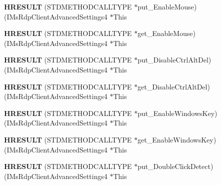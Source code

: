 \begin{DoxyCompactItemize}
{\bfseries H\+R\+E\+S\+U\+LT} (S\+T\+D\+M\+E\+T\+H\+O\+D\+C\+A\+L\+L\+T\+Y\+PE $\ast$put\+\_\+\+Enable\+Mouse)(I\+Ms\+Rdp\+Client\+Advanced\+Settings4 $\ast$This
\item 
\mbox{\label{struct_i_ms_rdp_client_advanced_settings4_vtbl_a400a5fcb065970bcc51a69e902e22c4b}} 
{\bfseries H\+R\+E\+S\+U\+LT} (S\+T\+D\+M\+E\+T\+H\+O\+D\+C\+A\+L\+L\+T\+Y\+PE $\ast$get\+\_\+\+Enable\+Mouse)(I\+Ms\+Rdp\+Client\+Advanced\+Settings4 $\ast$This
\item 
\mbox{\label{struct_i_ms_rdp_client_advanced_settings4_vtbl_a44094f00ae7624aa49920ff206dfb2fc}} 
{\bfseries H\+R\+E\+S\+U\+LT} (S\+T\+D\+M\+E\+T\+H\+O\+D\+C\+A\+L\+L\+T\+Y\+PE $\ast$put\+\_\+\+Disable\+Ctrl\+Alt\+Del)(I\+Ms\+Rdp\+Client\+Advanced\+Settings4 $\ast$This
\item 
\mbox{\label{struct_i_ms_rdp_client_advanced_settings4_vtbl_af8ef56e8b9ce6569364457fee005ec81}} 
{\bfseries H\+R\+E\+S\+U\+LT} (S\+T\+D\+M\+E\+T\+H\+O\+D\+C\+A\+L\+L\+T\+Y\+PE $\ast$get\+\_\+\+Disable\+Ctrl\+Alt\+Del)(I\+Ms\+Rdp\+Client\+Advanced\+Settings4 $\ast$This
\item 
\mbox{\label{struct_i_ms_rdp_client_advanced_settings4_vtbl_a095ab0be486223be6491a80d3983c56d}} 
{\bfseries H\+R\+E\+S\+U\+LT} (S\+T\+D\+M\+E\+T\+H\+O\+D\+C\+A\+L\+L\+T\+Y\+PE $\ast$put\+\_\+\+Enable\+Windows\+Key)(I\+Ms\+Rdp\+Client\+Advanced\+Settings4 $\ast$This
\item 
\mbox{\label{struct_i_ms_rdp_client_advanced_settings4_vtbl_a97183bc153cce30062012d3465c2a2e3}} 
{\bfseries H\+R\+E\+S\+U\+LT} (S\+T\+D\+M\+E\+T\+H\+O\+D\+C\+A\+L\+L\+T\+Y\+PE $\ast$get\+\_\+\+Enable\+Windows\+Key)(I\+Ms\+Rdp\+Client\+Advanced\+Settings4 $\ast$This
\item 
\mbox{\label{struct_i_ms_rdp_client_advanced_settings4_vtbl_a01949ac1757997f65d9097f3c7cb6f90}} 
{\bfseries H\+R\+E\+S\+U\+LT} (S\+T\+D\+M\+E\+T\+H\+O\+D\+C\+A\+L\+L\+T\+Y\+PE $\ast$put\+\_\+\+Double\+Click\+Detect)(I\+Ms\+Rdp\+Client\+Advanced\+Settings4 $\ast$This

\end{DoxyCompactItemize}
